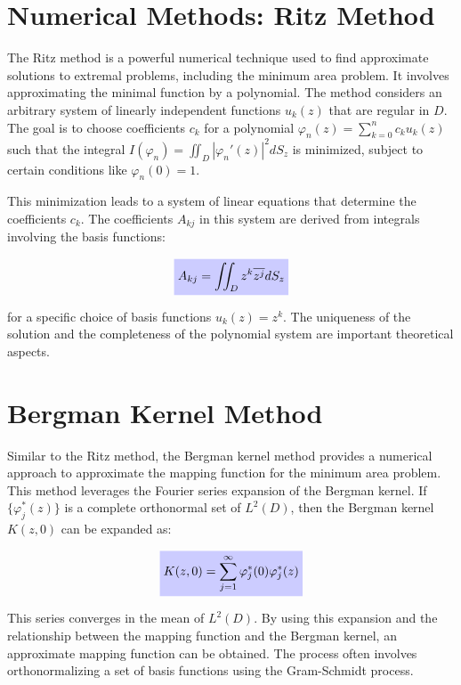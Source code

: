 \documentclass[12pt, a4paper]{report}
\newcommand{\highlight}[2]{\colorbox{#1!20}{$\displaystyle #2$}}
\newcommand{\impformula}[1]{\highlight{blue}{#1}}
\begin{document}
\section{Numerical Methods: Ritz Method}

The Ritz method is a powerful numerical technique used to find approximate solutions to extremal problems, including the minimum area problem. It involves approximating the minimal function by a polynomial. The method considers an arbitrary system of linearly independent functions $u_k(z)$ that are regular in $D$. The goal is to choose coefficients $c_k$ for a polynomial $\varphi_n(z) = \sum_{k=0}^n c_k u_k(z)$ such that the integral $I(\varphi_n) = \iint_D |\varphi_n'(z)|^2 dS_z$ is minimized, subject to certain conditions like $\varphi_n(0) = 1$.

This minimization leads to a system of linear equations that determine the coefficients $c_k$. The coefficients $A_{kj}$ in this system are derived from integrals involving the basis functions:

\begin{equation}
    \impformula{A_{kj} = \iint_D z^k \overline{z^j} dS_z} \label{eq:ritz_coefficients}
\end{equation}

for a specific choice of basis functions $u_k(z) = z^k$. The uniqueness of the solution and the completeness of the polynomial system are important theoretical aspects.

\section{Bergman Kernel Method}

Similar to the Ritz method, the Bergman kernel method provides a numerical approach to approximate the mapping function for the minimum area problem. This method leverages the Fourier series expansion of the Bergman kernel. If $\{\varphi_j^*(z)\}$ is a complete orthonormal set of $L^2(D)$, then the Bergman kernel $K(z,0)$ can be expanded as:

\begin{equation}
    \impformula{K(z,0) = \sum_{j=1}^\infty \varphi_j^*(0) \varphi_j^*(z)} \label{eq:bergman_series}
\end{equation}

This series converges in the mean of $L^2(D)$. By using this expansion and the relationship between the mapping function and the Bergman kernel, an approximate mapping function can be obtained. The process often involves orthonormalizing a set of basis functions using the Gram-Schmidt process.
\end{document}
